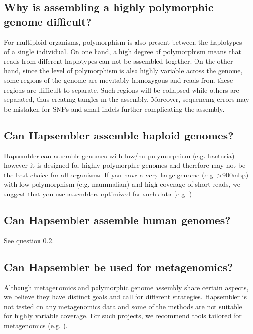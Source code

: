 \documentclass[12pt,a4paper]{report}
\begin{document}
\subsection{Why is assembling a highly polymorphic genome difficult?}

For multiploid organisms, polymorphism is also present between the haplotypes of a single individual. On one hand, a high degree of polymorphism means that reads from different haplotypes can not be assembled together. On the other hand, since the level of polymorphism is also highly variable across the genome, some regions of the genome are inevitably homozygous and reads from these regions are difficult to separate. Such regions will be collapsed while others are separated, thus creating tangles in the assembly. Moreover, sequencing errors may be mistaken for SNPs and small indels further complicating the assembly.

\subsection{Can Hapsembler assemble haploid genomes?}
\label{haploid}

Hapsembler can assemble genomes with low/no polymorphism (e.g. bacteria) however it is designed for highly polymorphic genomes and therefore may not be the best choice for all organisms. If you have a very large genome (e.g. >900mbp) with low polymorphism (e.g. mammalian) and high coverage of short reads, we suggest that you use assemblers optimized for such data (e.g. \cite{simpson}).

\subsection{Can Hapsembler assemble human genomes?}

See question \ref{haploid}.

\subsection{Can Hapsembler be used for metagenomics?}

Although metagenomics and polymorphic genome assembly share certain aspects, we believe they have distinct goals and call for different strategies. Hapsembler is not tested on any metagenomics data and some of the methods are not suitable for highly variable coverage. For such projects, we recommend tools tailored for metagenomics (e.g. \cite{laserson}).
\end{document}
